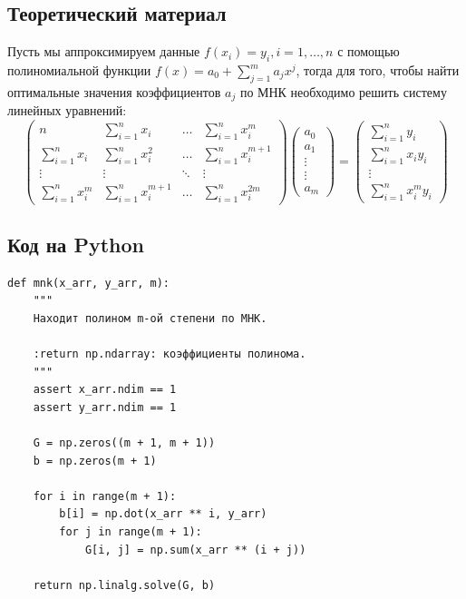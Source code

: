 \documentclass[12pt]{article}%
\begin{document}
\subsection{Теоретический материал}
Пусть мы аппроксимируем данные $ f(x_i) = y_i, i=1,\dots, n$ с помощью полиномиальной функции $f(x) = a_0 + \sum\limits_{j = 1}^m a_j x^j$, тогда для того, чтобы найти оптимальные значения коэффициентов $a_j$ по МНК необходимо решить систему линейных уравнений:
\[
\begin{pmatrix}
    n & \sum\limits_{i=1}^n x_i & 
    \dots &  \sum\limits_{i=1}^n x_i^m \\
    
    \sum\limits_{i=1}^n x_i & \sum\limits_{i=1}^n x_i^2 & 
    \dots & \sum\limits_{i=1}^n x_i^{m + 1} \\

    \vdots & \vdots & \ddots & \vdots \\

    \sum\limits_{i=1}^n x_i^m  & \sum\limits_{i=1}^n x_i^{m+1} &
    \dots & \sum\limits_{i=1}^n x_i^{2m}
\end{pmatrix} \begin{pmatrix}
    a_0 \\
    a_1 \\
    \vdots \\
    \vdots \\ 
    a_m
\end{pmatrix} = \begin{pmatrix}
    \sum\limits_{i=1}^n y_i \\
    \sum\limits_{i=1}^n x_i y_i \\
    \vdots \\
    \sum\limits_{i=1}^n x_i^m y_i
\end{pmatrix}
\]

\subsection{Код на Python}
\begin{verbatim}
def mnk(x_arr, y_arr, m):
    """
    Находит полином m-ой степени по МНК.

    :return np.ndarray: коэффициенты полинома.
    """
    assert x_arr.ndim == 1
    assert y_arr.ndim == 1
    
    G = np.zeros((m + 1, m + 1))
    b = np.zeros(m + 1)

    for i in range(m + 1):
        b[i] = np.dot(x_arr ** i, y_arr)
        for j in range(m + 1):
            G[i, j] = np.sum(x_arr ** (i + j))
            
    return np.linalg.solve(G, b)
\end{verbatim}
\end{document}
